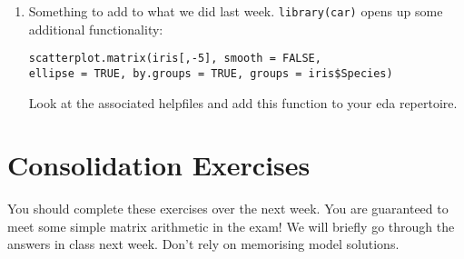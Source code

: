 \documentclass{article}
\begin{document}
\begin{enumerate}
\item Something to add to what we did last week.   \texttt{library(car)} opens up some additional functionality:   
\begin{verbatim}
scatterplot.matrix(iris[,-5], smooth = FALSE, 
ellipse = TRUE, by.groups = TRUE, groups = iris$Species)
\end{verbatim}
Look at the associated helpfiles and add this function to your eda repertoire.
\end{enumerate} 




\section{Consolidation Exercises}

You should complete these exercises over the next week.   You are guaranteed to meet some simple matrix arithmetic in the exam!   We will briefly go through the answers in class next week.   Don't rely on memorising model solutions.
\end{document}
